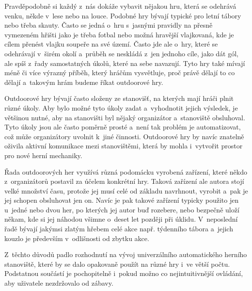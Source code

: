 Pravděpodobně si každý z~nás dokáže vybavit nějakou hru, která se odehrává venku, někde v~lese nebo na louce.
Podobné hry bývají typické pro letní tábory nebo třeba skauty.
Často se jedná o~hru s~jasnými pravidly na přesně vymezeném hřišti jako je třeba fotbal nebo možná hravější vlajkovaná, kde je cílem přenést vlajku soupeře na své území. 
Často jde ale o~hry, které se odehrávají v~širém okolí a~průběh se neskládá z~jen jednoho cíle, jako dát gól, ale spíš z~řady samostatných úkolů, které na sebe navazují.
Tyto hry také mívají méně či více výrazný příběh, který hráčům vysvětluje, proč právě dělají to co dělají a~takovým hrám budeme říkat outdoorové hry.

Outdoorové hry bývají často složeny ze stanovišť, na kterých mají hráči plnit různé úkoly.
Aby bylo možné tyto úkoly zadat a~vyhodnotit jejich výsledek, je většinou nutné, aby na stanovišti byl nějaký organizátor a~stanoviště obsluhoval.
Tyto úkoly jsou ale často poměrně prosté a~není tak problém je automatizovat, což může organizátory uvolnit k~jiné činnosti.
Outdoorové hry by navíc znatelně oživila aktivní komunikace mezi stanovištěmi, která by mohla i~vytvořit prostor pro nové herní mechaniky.

Řada outdoorových her využívá různá podomácku vyrobená zařízení, které někdo z~organizátorů postavil za účelem konkrétní hry.
Taková zařízení ale autora stojí velké množství času, protože jej musí celé od základu navrhnout, vyrobit a~pak je jej schopen obsluhovat jen on.
Navíc je pak takové zařízení typicky použito jen u~jedné nebo dvou her, po kterých jej autor buď rozebere, nebo bezpečně uloží někam, kde si jej náhodou všimne o~deset let později při úklidu.
V~neposlední řadě bývají jakýmsi zlatým hřebem celé akce např. týdenního tábora a~jejich kouzlo je především v~odlišnosti od zbytku akce.

Z~těchto důvodů padlo rozhodnutí na vývoj univerzálního automatického herního stanoviště, které by se dalo opakovaně použít na různé hry i~ve větší počtu.
Podstatnou součástí je pochopitelně i~pokud možno co nejintuitivnější ovládání, aby uživatele nezdržovalo od zábavy.




